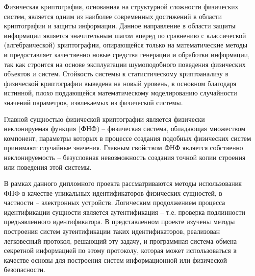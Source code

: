 \label{sec:intro}

Физическая криптография, основанная на структурной сложности физических систем, является одним из наиболее современных достижений в области криптографии и защиты информации. Данное направление в области защиты информации является значительным шагом вперед по сравнению с классической (алгебраической) криптографии, опирающейся только на математические методы и предоставляет качественно новые средства генерации и обработки информации, так как строится на основе эксплуатации шумоподобного поведения физических объектов и систем. Стойкость системы к статистическому криптоанализу в физической криптографии выведена на новый уровень, в основном благодаря истинной, плохо поддающейся математическому моделированию случайности значений параметров, извлекаемых из физической системы.

Главной сущностью физической криптографии является физически неклонируемая функция (ФНФ) -- физическая система, обладающая множеством компонент, параметры которых в процессе создания подобных физических систем принимают случайные значения. Главным свойством ФНФ является собственно неклонируемость -- безусловная невозможность создания точной копии строения или поведения этой системы.

В рамках данного дипломного проекта рассматриваются методы использования ФНФ в качестве уникальных идентификаторов физических сущностей, в частности -- электронных устройств. Логическим продолжением процесса идентификации сущности является аутентификация -- т.е. проверка подлинности предъявленного идентификатора. В представленном проекте изучены методы построения систем аутентификации таких идентификаторов, реализован легковесный протокол, решающий эту задачу, и программная система обмена секретной информацией по этому протоколу, которая может использоваться в качестве основы для построения систем информационной или физической безопасности.
